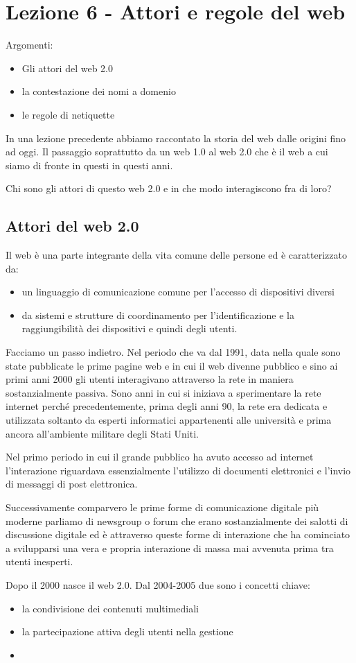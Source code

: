 \chapter{Lezione 6 - Attori e regole del web}

Argomenti:

\begin{itemize}
    \item Gli attori del web 2.0
    \item la contestazione dei nomi a domenio
    \item le regole di netiquette
\end{itemize}
In una lezione precedente abbiamo raccontato la storia del web dalle origini fino ad oggi. Il passaggio soprattutto da un web 1.0 al web 2.0 che è il web a cui siamo di fronte in questi in questi anni.\par
Chi sono gli attori di questo web 2.0 e in che modo interagiscono fra di loro?
\section{Attori del web 2.0}
Il web è una parte integrante della vita comune delle persone ed è caratterizzato da:
\begin{itemize}
    \item un linguaggio di comunicazione comune per l'accesso di dispositivi diversi
    \item da sistemi e strutture di coordinamento per l'identificazione e la raggiungibilità dei dispositivi e quindi degli utenti.
\end{itemize}

Facciamo un passo indietro. Nel periodo che va dal 1991, data nella quale sono state pubblicate le prime pagine web e in cui il web divenne pubblico e sino ai primi anni 2000 gli utenti interagivano attraverso la rete in maniera sostanzialmente passiva. Sono anni in cui si iniziava a sperimentare la rete internet perché precedentemente, prima degli anni 90, la rete era dedicata e utilizzata soltanto da esperti informatici appartenenti alle università e prima ancora all'ambiente militare degli Stati Uniti. \par
Nel primo periodo in cui il grande pubblico ha avuto accesso ad internet l'interazione riguardava essenzialmente l'utilizzo di documenti elettronici e l'invio di messaggi di post elettronica.\par Successivamente comparvero le prime forme di comunicazione digitale più moderne parliamo di newsgroup o forum che erano sostanzialmente dei salotti di discussione digitale ed è attraverso queste forme di interazione che ha cominciato a svilupparsi una vera e propria interazione di massa mai avvenuta prima tra utenti inesperti.\par
Dopo il 2000 nasce il web 2.0.
Dal 2004-2005 due sono i concetti chiave:
\begin{itemize}
    \item la condivisione dei contenuti multimediali
    \item la partecipazione attiva degli utenti nella gestione
    \item
\end{itemize}

